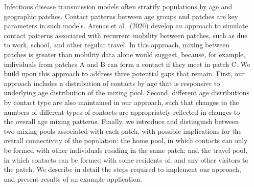 Infectious disease transmission models often stratify populations by age and geographic patches.
Contact patterns between age groups and patches are key parameters in such models.
Arenas et al.\ (2020) develop an approach to simulate contact patterns associated with
recurrent mobility between patches, such as due to work, school, and other regular travel.
In this approach, mixing between patches is greater than mobility data alone would suggest,
because, for example, individuals from patches A and B can form a contact if they meet in patch C.
We build upon this approach to address three potential gaps that remain.
First, our approach includes a distribution of contacts by age
that is responsive to underlying age distribution of the mixing pool.
Second, different age distributions by contact type are also maintained in our approach,
such that changes to the numbers of different types of contacts
are appropriately reflected in changes to the overall age mixing patterns.
Finally, we introduce and distinguish between two mixing pools associated with each patch,
with possible implications for the overall connectivity of the population:
the home pool, in which contacts can only be formed with other individuals residing in the same patch;
and the travel pool, in which contacts can be formed with some residents of, and any other visitors to the patch.
We describe in detail the steps required to implement our approach,
and present results of an example application.
